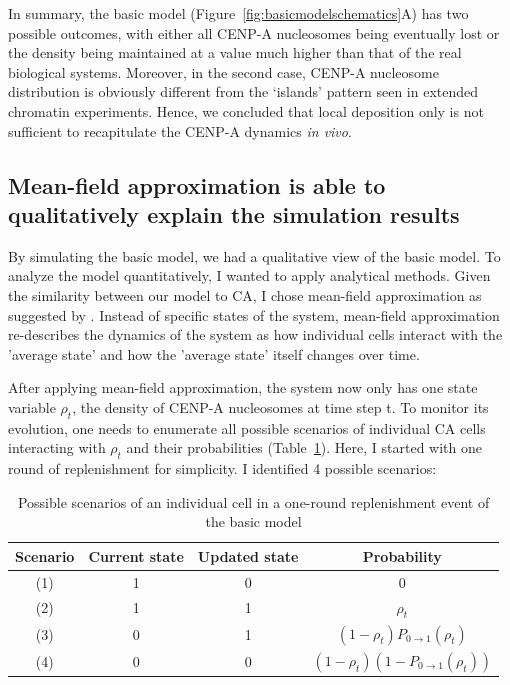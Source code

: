 In summary, the basic model (Figure~\ref{fig:basicmodelschematics}A) has two possible outcomes, with either all CENP-A nucleosomes being eventually lost or the density being maintained at a value much higher than that of the real biological systems. Moreover, in the second case, CENP-A nucleosome distribution is obviously different from the ‘islands’ pattern seen in extended chromatin experiments. Hence, we concluded that local deposition only is not sufficient to recapitulate the CENP-A dynamics \textit{in vivo}.


\subsection{Mean-field approximation is able to qualitatively explain the simulation results}

By simulating the basic model, we had a qualitative view of the basic model. To analyze the model
quantitatively, I wanted to apply analytical methods. Given the similarity between our model to CA, I chose mean-field
approximation as suggested by \cite{Sayama2013IntroductionSystems}. Instead of specific states of the system, mean-field approximation re-describes the dynamics of the system as how individual cells interact with the ’average state’ and how the ’average state’ itself changes over time. 

After applying mean-field approximation, the system now only has one state variable $\rho_{t}$, the density of CENP-A nucleosomes at time step t. To monitor its evolution, one needs to enumerate all possible scenarios of individual CA cells interacting with $\rho_{t}$ and their probabilities (Table~\ref{tab:MFAscenariosBasic}). Here, I started with one round of replenishment for simplicity. I identified 4 possible scenarios:

\begin{table}[htbp]
\centering
\caption{Possible scenarios of an individual cell in a one-round replenishment event of the basic model}
\label{tab:MFAscenariosBasic}
\begin{tabular}{cccc}
\hline
\textbf{Scenario} & \textbf{Current state} & \textbf{Updated state} & \textbf{Probability} \\ \hline
(1) & 1                        & 0                      & 0                    \\
(2) & 1                        & 1                      & $\rho_{t}$                    \\
(3) & 0                        & 1                      & $(1 - \rho_{t})P_{0\rightarrow 1}(\rho_{t})$     \\
(4) & 0                        & 0                      & $(1 - \rho_{t})(1 - P_{0\rightarrow 1}(\rho_{t}))$ \\ \hline
\end{tabular}
\end{table}

